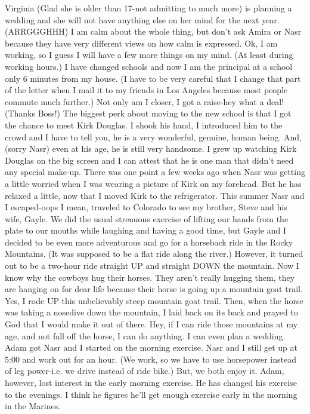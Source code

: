 Virginia (Glad she is older than 17-not admitting to much more) is planning a wedding and she will not have anything else on her mind for the
next year.  (ARRGGGHHH)   I am calm about the whole thing, but don't ask Amira or Nasr because they have very different views on how calm is
expressed.  Ok, I am working, so I guess I will have a few more things on my mind. (At least during working hours.) I have changed schools and
now I am the principal at a school only 6 minutes from my house. (I have to be very careful that I change that part of the letter when I mail it
to my friends in Los Angeles because most people commute much further.)  Not only am I closer, I got a raise-hey what a deal! (Thanks Boss!)
The biggest perk about moving to the new school is that I got the chance to meet Kirk Douglas.  I shook his hand, I introduced him to the crowd
and I have to tell you, he is a very wonderful, genuine, human being.  And, (sorry Nasr) even at his age, he is still very handsome.  I grew up
watching Kirk Douglas on the big screen and I can attest that he is one man that didn't need any special make-up.  There was one point a few
weeks ago when Nasr was getting a little worried when I was wearing a picture of Kirk on my forehead.  But he has relaxed a little, now that I
moved Kirk to the refrigerator.  This summer Nasr and I escaped-oops I mean, traveled to Colorado to see my brother, Steve and his wife, Gayle.
We did the usual strenuous exercise of lifting our hands from the plate to our mouths while laughing and having a good time, but Gayle and I
decided to be even more adventurous and go for a horseback ride in the Rocky Mountains.  (It was supposed to be a flat ride along the river.)
However, it turned out to be a two-hour ride straight UP and straight DOWN the mountain.  Now I know why the cowboys hug their horses.  They
aren't really hugging them, they are hanging on for dear life because their horse is going up a mountain goat trail.  Yes, I rode UP this
unbelievably steep mountain goat trail.  Then, when the horse was taking a nosedive down the mountain, I laid back on its back and prayed to God
that I would make it out of there. Hey, if I can ride those mountains at my age, and not fall off the horse, I can do anything.  I can even plan
a wedding.  Adam got Nasr and I started on the morning exercise.  Nasr and I still get up at 5:00 and work out for an hour.  (We work, so we
have to use horsepower instead of leg power-i.e. we drive instead of ride bike.)  But, we both enjoy it.  Adam, however, lost interest in the
early morning exercise.  He has changed his exercise to the evenings.  I think he figures he'll get enough exercise early in the morning in the
Marines.

